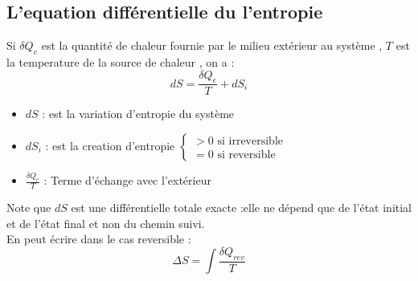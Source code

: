 \documentclass[12pt,oneside]{book}
\begin{document}
\subsection{L'equation différentielle du l'entropie}
Si $\delta Q_e$ est la quantité de chaleur fournie par le milieu extérieur au système , $T$ est la temperature de la source de chaleur , on a :
\[ \boxed{ dS = \frac{\delta Q_e}{T} + dS_i } \]
\begin{itemize}
    \item $dS$ : est la variation d'entropie du système
    \item $dS_i$ : est la creation d'entropie $\begin{cases}
                  > 0 \text{ si irreversible} \\
                  = 0 \text{ si reversible}
              \end{cases}$
    \item $\frac{\delta Q_e}{T}$ : Terme d’échange avec l’extérieur
\end{itemize}
Note que $dS$ est une différentielle totale exacte :elle ne dépend que de l'état initial et de l'état final et non du chemin suivi.\\
En peut écrire dans le cas reversible :
\[\Delta S = \int \frac{\delta Q_{rev}}{T}\]
\end{document}
